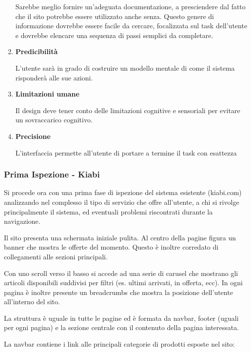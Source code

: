 \documentclass[12pt,italian,]{report}
\begin{document}
\begin{enumerate}
Sarebbe meglio fornire un'adeguata documentazione, a presciendere dal
fatto che il sito potrebbe essere utilizzato anche senza. Questo genere
di informazione dovrebbe essere facile da cercare, focalizzata sul task
dell'utente e dovrebbe elencare una sequenza di passi semplici da
completare.

\def\labelenumi{\arabic{enumi}.}
\setcounter{enumi}{10}
\item
    \textbf{Predicibilità}

L'utente sarà in grado di costruire un modello mentale di come il
sistema risponderà alle sue azioni.

\def\labelenumi{\arabic{enumi}.}
\setcounter{enumi}{11}
\item
  \textbf{Limitazioni umane}

Il design deve tener conto delle limitazioni cognitive e sensoriali per
evitare un sovraccarico cognitivo.

\def\labelenumi{\arabic{enumi}.}
\setcounter{enumi}{12}
\item
  \textbf{Precisione}

L'interfaccia permette all'utente di portare a termine il task con
esattezza
\end{enumerate}


\subsubsection{Prima Ispezione - Kiabi}\label{prima-ispezione}
Si procede ora con una prima fase di ispezione del sistema esistente (kiabi.com) analizzando nel complesso il tipo di servizio che offre all’utente, a chi si rivolge principalmente il sistema, ed eventuali problemi riscontrati durante la navigazione.

Il sito presenta una schermata iniziale pulita. Al centro della pagine figura un banner che mostra le offerte del momento. Questo è inoltre corredato di collegamenti alle sezioni principali. 

Con uno scroll verso il basso si accede ad una serie di carusel che mostrano gli articoli disponibili suddivisi per filtri (es. ultimi arrivati, in offerta, ecc).
In ogni pagina è inoltre presente un breadcrumbs che mostra la posizione dell'utente all'interno del sito.

La struttura è uguale in tutte le pagine ed è formata da navbar, footer (uguali per ogni pagina) e la sezione centrale con il contenuto della pagina interessata.

La navbar contiene i link alle principali categorie di prodotti esposte nel sito:
\end{document}
